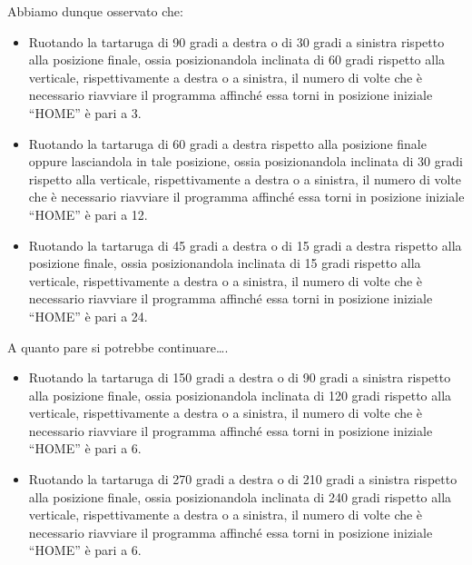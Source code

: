 Abbiamo dunque osservato che: 

\begin{itemize}

	\item Ruotando la tartaruga di 90 gradi a destra o di 30 gradi a
		sinistra rispetto alla posizione finale, ossia posizionandola
		inclinata di 60 gradi rispetto alla verticale, rispettivamente
		a destra o a sinistra, il numero di volte che è necessario
		riavviare il programma affinché essa torni in posizione
		iniziale “HOME” è pari a 3.
	
	\item Ruotando la tartaruga di 60 gradi a destra rispetto alla
		posizione finale oppure lasciandola in tale posizione, ossia
		posizionandola inclinata di 30 gradi rispetto alla verticale,
		rispettivamente a destra o a sinistra, il numero di volte che è
		necessario riavviare il programma affinché essa torni in
		posizione iniziale “HOME” è pari a 12.
	
	\item Ruotando la tartaruga di 45 gradi a destra o di 15 gradi a destra
		rispetto alla posizione finale, ossia posizionandola inclinata
		di 15 gradi rispetto alla verticale, rispettivamente a destra o
		a sinistra, il numero di volte che è necessario riavviare il
		programma affinché essa torni in posizione iniziale “HOME” è
		pari a 24.

\end{itemize}

A quanto pare si potrebbe continuare….

\begin{itemize}

\item Ruotando la tartaruga di 150 gradi a destra o di 90 gradi a sinistra
	rispetto alla posizione finale, ossia posizionandola inclinata di 120
		gradi rispetto alla verticale, rispettivamente a destra o a
		sinistra, il numero di volte che è necessario riavviare il
		programma affinché essa torni in posizione iniziale “HOME” è
		pari a 6.

\item Ruotando la tartaruga di 270 gradi a destra o di 210 gradi a sinistra
	rispetto alla posizione finale, ossia posizionandola inclinata di 240
		gradi rispetto alla verticale, rispettivamente a destra o a
		sinistra, il numero di volte che è necessario riavviare il
		programma affinché essa torni in posizione iniziale “HOME” è
		pari a 6.

\end{itemize}

